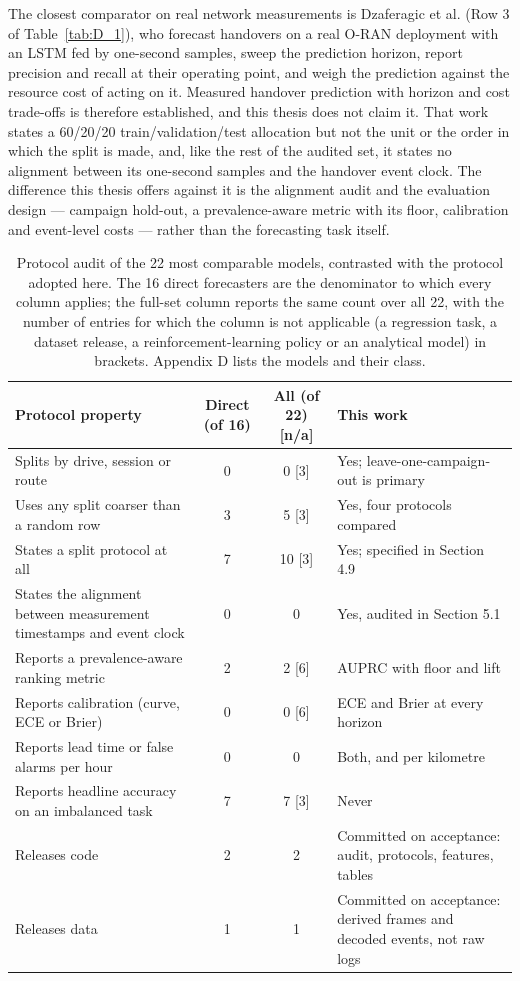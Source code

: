 The closest comparator on real network measurements is Dzaferagic et al. \cite{ref54} (Row 3 of Table~\ref{tab:D_1}), who forecast handovers on a real O-RAN deployment with an LSTM fed by one-second samples, sweep the prediction horizon, report precision and recall at their operating point, and weigh the prediction against the resource cost of acting on it. Measured handover prediction with horizon and cost trade-offs is therefore established, and this thesis does not claim it. That work states a 60/20/20 train/validation/test allocation but not the unit or the order in which the split is made, and, like the rest of the audited set, it states no alignment between its one-second samples and the handover event clock. The difference this thesis offers against it is the alignment audit and the evaluation design --- campaign hold-out, a prevalence-aware metric with its floor, calibration and event-level costs --- rather than the forecasting task itself.


\begin{table}[htbp]
\centering
\caption{Protocol audit of the 22 most comparable models, contrasted with the protocol adopted here. The 16 direct forecasters are the denominator to which every column applies; the full-set column reports the same count over all 22, with the number of entries for which the column is not applicable (a regression task, a dataset release, a reinforcement-learning policy or an analytical model) in brackets. Appendix D lists the models and their class.}
\label{tab:2_1}
\vspace{0.4em}
\singlespacing
\small
\begin{tabularx}{\linewidth}{p{4.6cm} c c X}
\toprule
\textbf{Protocol property} & \textbf{Direct (of 16)} & \textbf{All (of 22) [n/a]} & \textbf{This work} \\
\midrule
Splits by drive, session or route & 0 & 0 [3] & Yes; leave-one-campaign-out is primary \\
Uses any split coarser than a random row & 3 & 5 [3] & Yes, four protocols compared \\
States a split protocol at all & 7 & 10 [3] & Yes; specified in Section 4.9 \\
States the alignment between measurement timestamps and event clock & 0 & 0 & Yes, audited in Section 5.1 \\
Reports a prevalence-aware ranking metric & 2 & 2 [6] & AUPRC with floor and lift \\
Reports calibration (curve, ECE or Brier) & 0 & 0 [6] & ECE and Brier at every horizon \\
Reports lead time or false alarms per hour & 0 & 0 & Both, and per kilometre \\
Reports headline accuracy on an imbalanced task & 7 & 7 [3] & Never \\
Releases code & 2 & 2 & Committed on acceptance: audit, protocols, features, tables \\
Releases data & 1 & 1 & Committed on acceptance: derived frames and decoded events, not raw logs \\
\bottomrule
\end{tabularx}
\end{table}

